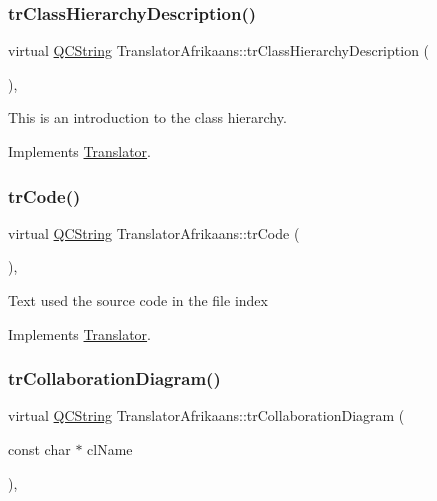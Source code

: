 \subsubsection{\texorpdfstring{trClassHierarchyDescription()}{trClassHierarchyDescription()}}
{\footnotesize\ttfamily virtual \mbox{\hyperlink{class_q_c_string}{Q\+C\+String}} Translator\+Afrikaans\+::tr\+Class\+Hierarchy\+Description (\begin{DoxyParamCaption}{ }\end{DoxyParamCaption})\hspace{0.3cm}{\ttfamily [inline]}, {\ttfamily [virtual]}}

This is an introduction to the class hierarchy. 

Implements \mbox{\hyperlink{class_translator}{Translator}}.

\mbox{\label{class_translator_afrikaans_a23493278be21cdb59fa38f5bfc2614a7}} 
\subsubsection{\texorpdfstring{trCode()}{trCode()}}
{\footnotesize\ttfamily virtual \mbox{\hyperlink{class_q_c_string}{Q\+C\+String}} Translator\+Afrikaans\+::tr\+Code (\begin{DoxyParamCaption}{ }\end{DoxyParamCaption})\hspace{0.3cm}{\ttfamily [inline]}, {\ttfamily [virtual]}}

Text used the source code in the file index 

Implements \mbox{\hyperlink{class_translator}{Translator}}.

\mbox{\label{class_translator_afrikaans_af2e90e8a07ea472e72b77efaf4ee4a3c}} 
\subsubsection{\texorpdfstring{trCollaborationDiagram()}{trCollaborationDiagram()}}
{\footnotesize\ttfamily virtual \mbox{\hyperlink{class_q_c_string}{Q\+C\+String}} Translator\+Afrikaans\+::tr\+Collaboration\+Diagram (\begin{DoxyParamCaption}\item[{const char $\ast$}]{cl\+Name }\end{DoxyParamCaption})\hspace{0.3cm}{\ttfamily [inline]}, {\ttfamily [virtual]}}

